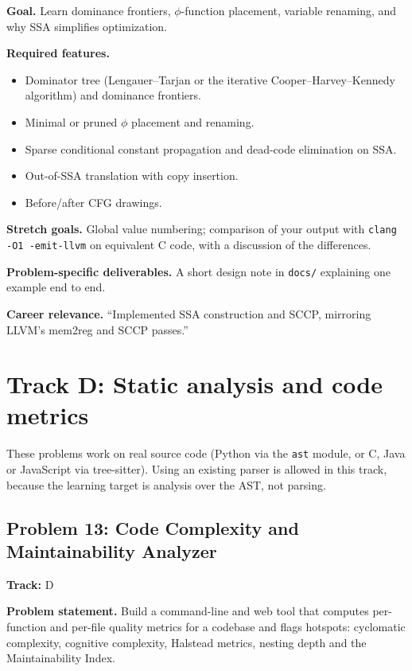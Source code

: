 \documentclass[11pt,a4paper]{article}
\newcommand{\fld}[1]{\par\smallskip\textbf{\color{accent}#1}\quad}
\newcommand{\meta}[1]{%
  \begin{tcolorbox}[colback=softbg,colframe=softbg,boxsep=2pt,left=4pt,right=4pt,top=2pt,bottom=2pt,arc=2pt]
  \small\textbf{Track:} #1
  \end{tcolorbox}}
\begin{document}
\fld{Goal.} Learn dominance frontiers, $\phi$-function placement, variable renaming, and why SSA simplifies optimization.

\fld{Required features.}
\begin{itemize}
  \item Dominator tree (Lengauer--Tarjan or the iterative Cooper--Harvey--Kennedy algorithm) and dominance frontiers.
  \item Minimal or pruned $\phi$ placement and renaming.
  \item Sparse conditional constant propagation and dead-code elimination on SSA.
  \item Out-of-SSA translation with copy insertion.
  \item Before/after CFG drawings.
\end{itemize}

\fld{Stretch goals.} Global value numbering; comparison of your output with
\texttt{clang -O1 -emit-llvm} on equivalent C code, with a discussion of the differences.

\fld{Problem-specific deliverables.} A short design note in \texttt{docs/} explaining one example end to end.

\fld{Career relevance.} ``Implemented SSA construction and SCCP, mirroring LLVM's mem2reg and SCCP passes.''

\section{Track D: Static analysis and code metrics}

These problems work on real source code (Python via the \texttt{ast} module, or C, Java or JavaScript
via tree-sitter). Using an existing parser is allowed in this track, because the learning target is
analysis over the AST, not parsing.

\subsection{Problem 13: Code Complexity and Maintainability Analyzer}
\meta{D}

\fld{Problem statement.} Build a command-line and web tool that computes per-function and per-file
quality metrics for a codebase and flags hotspots: cyclomatic complexity, cognitive complexity,
Halstead metrics, nesting depth and the Maintainability Index.
\end{document}
